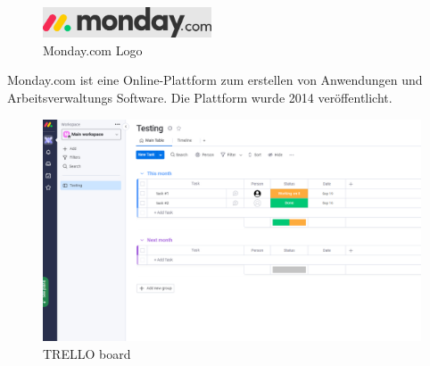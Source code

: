 
\begin{figure}[H]
    \begin{center}
        \includegraphics[width=5cm]{../content/images/monday.com/MondayLogo.png}
        \caption{Monday.com Logo}
    \end{center}
\end{figure}

Monday.com ist eine Online-Plattform zum erstellen von Anwendungen und Arbeitsverwaltungs Software.
Die Plattform wurde 2014 veröffentlicht.

\begin{figure}[H]
    \begin{center}
        \includegraphics[width=16cm]{../content/images/monday.com/MondayBoard.png}
        \caption{TRELLO board}
    \end{center}
\end{figure}

